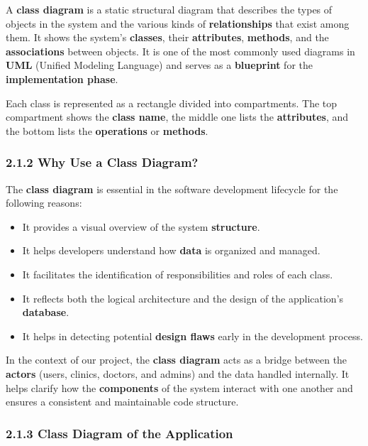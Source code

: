 \documentclass[12pt]{report}
\begin{document}
A \textbf{class diagram} is a static structural diagram that describes the types of objects in the system and the various kinds of \textbf{relationships} that exist among them. It shows the system's \textbf{classes}, their \textbf{attributes}, \textbf{methods}, and the \textbf{associations} between objects. It is one of the most commonly used diagrams in \textbf{UML} (Unified Modeling Language) and serves as a \textbf{blueprint} for the \textbf{implementation phase}.

\noindent Each class is represented as a rectangle divided into compartments. The top compartment shows the \textbf{class name}, the middle one lists the \textbf{attributes}, and the bottom lists the \textbf{operations} or \textbf{methods}.


\subsubsection*{2.1.2 Why Use a Class Diagram?}

The \textbf{class diagram} is essential in the software development lifecycle for the following reasons:

\begin{itemize}
	\item It provides a visual overview of the system \textbf{structure}.
	\item It helps developers understand how \textbf{data} is organized and managed.
	\item It facilitates the identification of responsibilities and roles of each class.
	\item It reflects both the logical architecture and the design of the application's \textbf{database}.
	\item It helps in detecting potential \textbf{design flaws} early in the development process.
\end{itemize}

\noindent In the context of our project, the \textbf{class diagram} acts as a bridge between the \textbf{actors} (users, clinics, doctors, and admins) and the data handled internally. It helps clarify how the \textbf{components} of the system interact with one another and ensures a consistent and maintainable code structure.


\subsubsection*{2.1.3 Class Diagram of the Application}
\end{document}
